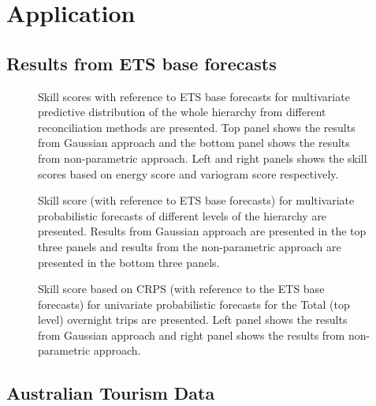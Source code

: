\documentclass[12pt]{article}
\theoremstyle{definition}
\begin{document}
\section{Application}

\subsection{Results from ETS base forecasts}

\begin{figure}[!hbt]
	\centering
	\small
	\caption{Skill scores with reference to ETS base forecasts for multivariate predictive distribution of the whole hierarchy from different reconciliation methods are presented. Top panel shows the results from Gaussian approach and the bottom panel shows the results from non-parametric approach. Left and right panels shows the skill scores based on energy score and variogram score respectively.}\label{fig:EmpResults_AllTS_ETS}
\end{figure}

\begin{figure}[!hbt]
	\centering
	\small
	\caption{Skill score (with reference to ETS base forecasts) for multivariate probabilistic forecasts of different levels of the hierarchy are presented. Results from Gaussian approach are presented in the top three panels and results from the non-parametric approach are presented in the bottom three panels.}\label{fig:EmpResults_Levels_ETS}
\end{figure}

\begin{figure}[!hbt]
	\centering
	\small
	\caption{Skill score based on CRPS (with reference to the ETS base forecasts) for univariate probabilistic forecasts for the Total (top level) overnight trips are presented. Left panel shows the results from Gaussian approach and right panel shows the results from non-parametric approach. }\label{fig:EmpResults_TopLevel_ETS}
\end{figure}

\FloatBarrier

\newpage
\subsection{Australian Tourism Data}
\end{document}
